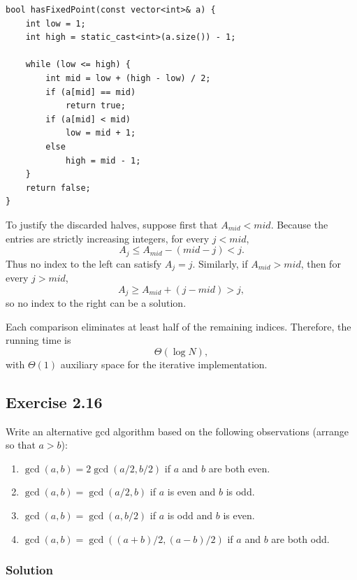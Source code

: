 \documentclass[12pt,a4paper]{article}
\begin{document}
\begin{lstlisting}
bool hasFixedPoint(const vector<int>& a) {
    int low = 1;
    int high = static_cast<int>(a.size()) - 1;

    while (low <= high) {
        int mid = low + (high - low) / 2;
        if (a[mid] == mid)
            return true;
        if (a[mid] < mid)
            low = mid + 1;
        else
            high = mid - 1;
    }
    return false;
}
\end{lstlisting}

To justify the discarded halves, suppose first that $A_{\mathit{mid}}<
\mathit{mid}$. Because the entries are strictly increasing integers,
for every $j<\mathit{mid}$,
\[
A_j\leq A_{\mathit{mid}}-(\mathit{mid}-j)<j.
\]
Thus no index to the left can satisfy $A_j=j$. Similarly, if
$A_{\mathit{mid}}>\mathit{mid}$, then for every $j>\mathit{mid}$,
\[
A_j\geq A_{\mathit{mid}}+(j-\mathit{mid})>j,
\]
so no index to the right can be a solution.

Each comparison eliminates at least half of the remaining indices.
Therefore, the running time is
\[
\boxed{\Theta(\log N)},
\]
with $\Theta(1)$ auxiliary space for the iterative implementation.

\subsection*{\color{sectionnavy}Exercise 2.16}

\noindent
Write an alternative gcd algorithm based on the following observations
(arrange so that $a>b$):

\begin{enumerate}
  \renewcommand{\labelenumi}{\alph{enumi}.}
  \item $\gcd(a,b)=2\gcd(a/2,b/2)$ if $a$ and $b$ are both even.
  \item $\gcd(a,b)=\gcd(a/2,b)$ if $a$ is even and $b$ is odd.
  \item $\gcd(a,b)=\gcd(a,b/2)$ if $a$ is odd and $b$ is even.
  \item $\gcd(a,b)=\gcd((a+b)/2,(a-b)/2)$ if $a$ and $b$ are both
  odd.
\end{enumerate}

\subsubsection*{\color{sectionnavy}Solution}
\end{document}
